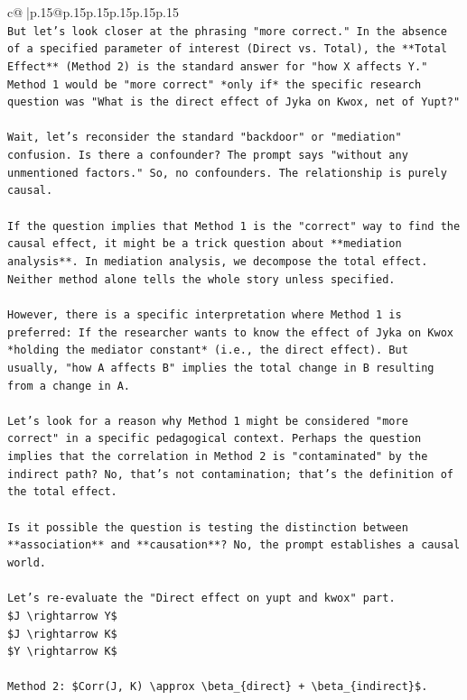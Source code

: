 \documentclass{article}
\begin{document}
{\begin{supertabular}{c@{$\;$}|p{.15\linewidth}@{}p{.15\linewidth}p{.15\linewidth}p{.15\linewidth}p{.15\linewidth}p{.15\linewidth}}
{{{\\ 
\texttt{But let's look closer at the phrasing "more correct." In the absence of a specified parameter of interest (Direct vs. Total), the **Total Effect** (Method 2) is the standard answer for "how X affects Y." Method 1 would be "more correct" *only if* the specific research question was "What is the direct effect of Jyka on Kwox, net of Yupt?"} \\
\\ 
\texttt{Wait, let's reconsider the standard "backdoor" or "mediation" confusion. Is there a confounder? The prompt says "without any unmentioned factors." So, no confounders. The relationship is purely causal.} \\
\\ 
\texttt{If the question implies that Method 1 is the "correct" way to find the causal effect, it might be a trick question about **mediation analysis**. In mediation analysis, we decompose the total effect. Neither method alone tells the whole story unless specified.} \\
\\ 
\texttt{However, there is a specific interpretation where Method 1 is preferred: If the researcher wants to know the effect of Jyka on Kwox *holding the mediator constant* (i.e., the direct effect). But usually, "how A affects B" implies the total change in B resulting from a change in A.} \\
\\ 
\texttt{Let's look for a reason why Method 1 might be considered "more correct" in a specific pedagogical context. Perhaps the question implies that the correlation in Method 2 is "contaminated" by the indirect path? No, that's not contamination; that's the definition of the total effect.} \\
\\ 
\texttt{Is it possible the question is testing the distinction between **association** and **causation**? No, the prompt establishes a causal world.} \\
\\ 
\texttt{Let's re{-}evaluate the "Direct effect on yupt and kwox" part.} \\
\texttt{\$J \textbackslash{}rightarrow Y\$} \\
\texttt{\$J \textbackslash{}rightarrow K\$} \\
\texttt{\$Y \textbackslash{}rightarrow K\$} \\
\\ 
\texttt{Method 2: \$Corr(J, K) \textbackslash{}approx \textbackslash{}beta\_\{direct\} + \textbackslash{}beta\_\{indirect\}\$.} \\
}}}
\end{supertabular}}
\end{document}
